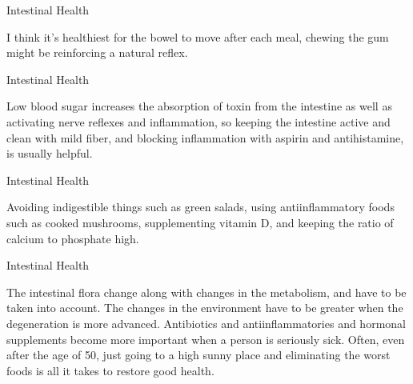 \documentclass[11pt,oneside,openany,extrafontsizes]{memoir}
\begin{document}
\begin{standalonequote}{Intestinal Health}

    \begin{answer}
      I think it's healthiest for the bowel to move after each meal, chewing the gum might be reinforcing a natural reflex.
    \end{answer}
\end{standalonequote}

\begin{standalonequote}{Intestinal Health}

    \begin{answer}
      Low blood sugar increases the absorption of toxin from the intestine as well as activating nerve reflexes and inflammation, so keeping the intestine active and clean with mild fiber, and blocking inflammation with aspirin and antihistamine, is usually helpful.
    \end{answer}
\end{standalonequote}

\begin{standalonequote}{Intestinal Health}

    \begin{answer}
       Avoiding indigestible things such as green salads, using antiinflammatory foods such as cooked mushrooms, supplementing vitamin D, and keeping the ratio of calcium to phosphate high.
    \end{answer}
\end{standalonequote}

\begin{standalonequote}{Intestinal Health}

    \begin{answer}
       The intestinal flora change along with changes in the metabolism, and have to be taken into account. The changes in the environment have to be greater when the degeneration is more advanced. Antibiotics and antiinflammatories and hormonal supplements become more important when a person is seriously sick. Often, even after the age of 50, just going to a high sunny place and eliminating the worst foods is all it takes to restore good health. 
    \end{answer}
\end{standalonequote}
\end{document}
